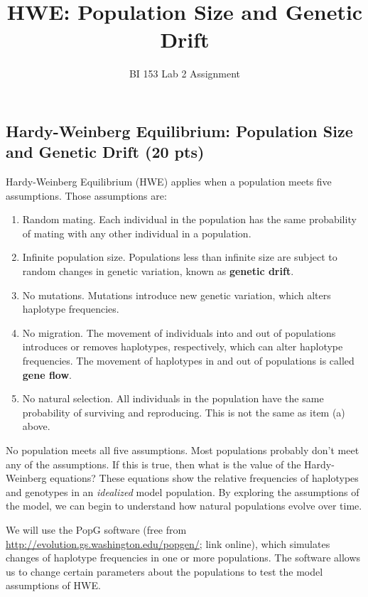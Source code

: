 \documentclass[11pt]{article}
\title{HWE: Population Size and Genetic Drift}
\author{BI 153 Lab 2 Assignment}
\date{}                                           %
\begin{document}
\thispagestyle{firstpage}
\subsection*{Hardy-Weinberg Equilibrium: Population Size and Genetic Drift (20 pts)}

Hardy-Weinberg Equilibrium (HWE) applies when a population meets five assumptions. Those assumptions
are:

\begin{enumerate}[label=\alph*.]

\item Random mating. Each individual in the population has the same
probability of mating with any other individual in a population.

\item Infinite population size. Populations less than infinite size
are subject to random changes in genetic variation, known as
\textbf{genetic drift}.

\item No mutations. Mutations introduce new genetic variation, which
alters haplotype frequencies.

\item No migration. The movement of individuals into and out of
populations introduces or removes haplotypes, respectively, which can
alter haplotype frequencies. The movement of haplotypes in and out of
populations is called \textbf{gene flow}.

\item No natural selection. All individuals in the population have
the same probability of surviving and reproducing. This is not the same
as item (a) above.

\end{enumerate}

No population meets all five assumptions. Most populations probably
don't meet any of the assumptions. If this is true, then what is the
value of the Hardy-Weinberg equations? These equations show the relative
frequencies of haplotypes and genotypes in an \emph{idealized} model
population. By exploring the assumptions of the model, we can begin to
understand how natural populations evolve over time.

We will use the PopG software (free from
\url{http://evolution.gs.washington.edu/popgen/}; link online), which
simulates changes of haplotype frequencies in one or more populations.
The software allows us to change certain parameters about the
populations to test the model assumptions of HWE.
\end{document}
